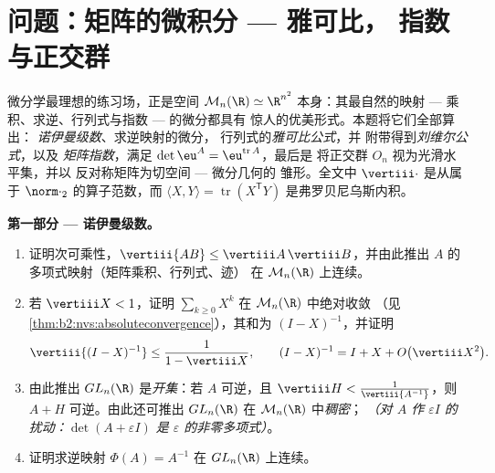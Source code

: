 \section{问题：矩阵的微积分 --- 雅可比，
指数与正交群}

\begin{problem}\label{pb:b2:diffcalc:1}
微分学最理想的练习场，正是空间
$\mathcal M_n(\R) \simeq \R^{n^2}$ 本身：其最自然的映射
--- 乘积、求逆、行列式与指数 --- 的微分都具有
惊人的优美形式。本题将它们全部算出：
\emph{诺伊曼级数}、求逆映射的微分，
行列式的\emph{雅可比公式}，并
附带得到\emph{刘维尔公式}，以及
\emph{矩阵指数}，满足
$\det\eu^A = \eu^{\operatorname{tr}A}$，最后是
将正交群 $O_n$ 视为光滑水平集，并以
反对称矩阵为切空间 --- 微分几何的
雏形。全文中 $\vertiii\cdot$ 是从属于
$\norm\cdot_2$ 的算子范数，而 $\langle X, Y\rangle =
\operatorname{tr}(X^{\mathsf T}Y)$ 是弗罗贝尼乌斯内积。

\medskip
\noindent\textbf{第一部分 --- 诺伊曼级数。}
\begin{enumerate}
  \item 证明次可乘性，$\vertiii{AB} \leq
        \vertiii A\,\vertiii B$，并由此推出
        $A$ 的多项式映射（矩阵乘积、行列式、迹）
        在 $\mathcal M_n(\R)$ 上连续。
  \item 若 $\vertiii X < 1$，证明 $\sum_{k\geq0}X^k$
        在 $\mathcal M_n(\R)$ 中绝对收敛
        （见\cref{thm:b2:nvs:absoluteconvergence}），其和为
        $(I - X)^{-1}$，并证明
        \[
        \vertiii{(I - X)^{-1}} \leq \frac{1}{1 - \vertiii X},
        \qquad
        (I - X)^{-1} = I + X + O\bigl(\vertiii X^2\bigr) .
        \]
  \item 由此推出 $GL_n(\R)$ 是\emph{开集}：若 $A$
        可逆，且 $\vertiii H <
        \frac{1}{\vertiii{A^{-1}}}$，则 $A + H$
        可逆。由此还可推出 $GL_n(\R)$ 在 $\mathcal M_n(\R)$ 中\emph{稠密}；
        \emph{（对 $A$ 作
        $\varepsilon I$ 的扰动：$\det(A + \varepsilon I)$ 是
        $\varepsilon$ 的非零多项式）}。
  \item 证明求逆映射 $\Phi(A) = A^{-1}$ 在
        $GL_n(\R)$ 上连续。
\end{enumerate}


\end{problem}
